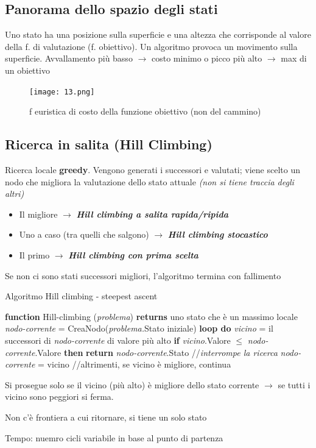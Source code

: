 \documentclass{article}
\begin{document}
\subsection{Panorama dello spazio degli stati}
Uno stato ha una posizione sulla superficie e una altezza che corrisponde al valore della f. di valutazione (f. obiettivo). Un algoritmo provoca un movimento sulla superficie. 
Avvallamento più basso $\rightarrow$ costo minimo o picco più alto $\rightarrow$ max di un obiettivo

\begin{figure}[H]
    \begin{center}
    \texttt{[image: 13.png]}
    \caption{f euristica di costo della funzione obiettivo (non del cammino)}
    \end{center}
\end{figure}
\newpage
\subsection{Ricerca in salita (Hill Climbing)}
Ricerca locale \textbf{greedy}. Vengono generati i successori e valutati; viene scelto un nodo che migliora la valutazione dello stato attuale \textit{(non si tiene traccia degli altri)} 
\begin{itemize}
    \item Il migliore $\rightarrow$ \textit{\textbf{Hill climbing a salita rapida/ripida}}
    \item Uno a caso (tra quelli che salgono) $\rightarrow$ \textit{\textbf{Hill climbing stocastico}}
    \item Il primo $\rightarrow$ \textbf{\textit{Hill climbing con prima scelta}}
\end{itemize}
\begin{center} Se non ci sono stati successori migliori, l'algoritmo termina con fallimento\end{center}

\begin{algorithm}[H]
\caption{Algoritmo Hill climbing - steepest ascent}
  
        \textbf{function} Hill-climbing (\textit{problema})\newline
        \null\quad \textbf{returns} uno stato che è un massimo locale\newline
        \null\quad \textit{nodo-corrente} = CreaNodo(\textit{problema.}Stato iniziale)\newline
        \null\quad \textbf{loop do}\newline
        \null\qquad \textit{vicino} = il successori di \textit{nodo-corrente} di valore più alto\newline
        \null\qquad \textbf{if} \textit{vicino}.Valore $\leq$ \textit{nodo-corrente}.Valore \textbf{then} \textbf{return} \textit{nodo-corrente}.Stato //\textit{interrompe la ricerca}\newline
        \null\qquad \textit{nodo-corrente} = vicino //altrimenti, se vicino è migliore, continua
    
\end{algorithm}

\begin{center}
    Si prosegue solo se il vicino (più alto) è migliore dello stato corrente $\rightarrow$ se tutti i vicino sono peggiori si ferma.
    
    Non c'è frontiera a cui ritornare, si tiene un solo stato
    
    Tempo: nuemro cicli variabile in base al punto di partenza
\end{center}
\end{document}
